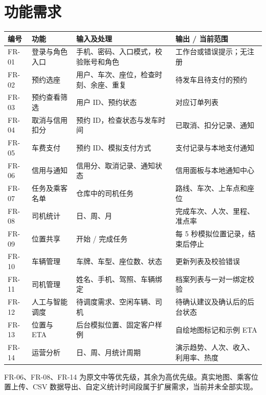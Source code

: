 \documentclass[UTF8,fontset=fandol,zihao=-4,oneside]{ctexrep}
\begin{document}
\section{功能需求}
\begin{longtable}{p{1.2cm}p{3.5cm}p{5cm}p{4.7cm}}
\toprule 编号 & 功能 & 输入及处理 & 输出 / 当前范围 \\ \midrule
FR-01 & 登录与角色入口 & 手机、密码、入口模式，校验账号和角色 & 工作台或错误提示；无注册 \\
FR-02 & 预约选座 & 用户、车次、座位，检查时刻、余座、重复 & 待发车且待支付的预约 \\
FR-03 & 预约查看筛选 & 用户 ID、预约状态 & 对应订单列表 \\
FR-04 & 取消与信用扣分 & 预约 ID，检查状态与发车时间 & 已取消、扣分记录、通知 \\
FR-05 & 车费支付 & 预约 ID、模拟支付方式 & 支付记录与本地支付通知 \\
FR-06 & 信用与通知 & 信用分、取消记录、通知状态 & 信用面板与本地通知中心 \\
FR-07 & 任务及乘客名单 & 仓库中的司机任务 & 路线、车次、上车点和座位 \\
FR-08 & 司机统计 & 日、周、月 & 完成车次、人次、里程、准点率 \\
FR-09 & 位置共享 & 开始 / 完成任务 & 每 5 秒模拟位置记录，结束后停止 \\
FR-10 & 车辆管理 & 车牌、车型、座位数、状态 & 更新列表及校验错误 \\
FR-11 & 司机管理 & 姓名、手机、驾照、车辆绑定 & 档案列表与一对一绑定校验 \\
FR-12 & 人工与智能调度 & 待调度需求、空闲车辆、司机 & 待确认建议及确认后的后台状态 \\
FR-13 & 位置与 ETA & 后台模拟位置、固定客户样例 & 自绘地图标记和示例 ETA \\
FR-14 & 运营分析 & 日、周、月统计周期 & 演示趋势、人次、收入、利用率、热度 \\
\bottomrule
\end{longtable}
FR-06、FR-08、FR-14 为原文中等优先级，其余为高优先级。真实地图、乘客位置上传、CSV 数据导出、自定义统计时间段属于扩展需求，当前并未全部实现。
\end{document}
